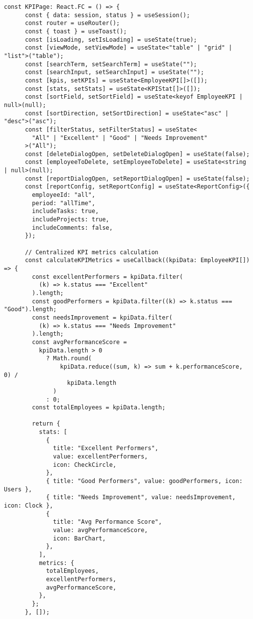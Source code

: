 \begin{lstlisting}[language=Golang, caption=Routes, frame=single]
    const KPIPage: React.FC = () => {
      const { data: session, status } = useSession();
      const router = useRouter();
      const { toast } = useToast();
      const [isLoading, setIsLoading] = useState(true);
      const [viewMode, setViewMode] = useState<"table" | "grid" | "list">("table");
      const [searchTerm, setSearchTerm] = useState("");
      const [searchInput, setSearchInput] = useState("");
      const [kpis, setKPIs] = useState<EmployeeKPI[]>([]);
      const [stats, setStats] = useState<KPIStat[]>([]);
      const [sortField, setSortField] = useState<keyof EmployeeKPI | null>(null);
      const [sortDirection, setSortDirection] = useState<"asc" | "desc">("asc");
      const [filterStatus, setFilterStatus] = useState<
        "All" | "Excellent" | "Good" | "Needs Improvement"
      >("All");
      const [deleteDialogOpen, setDeleteDialogOpen] = useState(false);
      const [employeeToDelete, setEmployeeToDelete] = useState<string | null>(null);
      const [reportDialogOpen, setReportDialogOpen] = useState(false);
      const [reportConfig, setReportConfig] = useState<ReportConfig>({
        employeeId: "all",
        period: "allTime",
        includeTasks: true,
        includeProjects: true,
        includeComments: false,
      });
    
      // Centralized KPI metrics calculation
      const calculateKPIMetrics = useCallback((kpiData: EmployeeKPI[]) => {
        const excellentPerformers = kpiData.filter(
          (k) => k.status === "Excellent"
        ).length;
        const goodPerformers = kpiData.filter((k) => k.status === "Good").length;
        const needsImprovement = kpiData.filter(
          (k) => k.status === "Needs Improvement"
        ).length;
        const avgPerformanceScore =
          kpiData.length > 0
            ? Math.round(
                kpiData.reduce((sum, k) => sum + k.performanceScore, 0) /
                  kpiData.length
              )
            : 0;
        const totalEmployees = kpiData.length;
    
        return {
          stats: [
            {
              title: "Excellent Performers",
              value: excellentPerformers,
              icon: CheckCircle,
            },
            { title: "Good Performers", value: goodPerformers, icon: Users },
            { title: "Needs Improvement", value: needsImprovement, icon: Clock },
            {
              title: "Avg Performance Score",
              value: avgPerformanceScore,
              icon: BarChart,
            },
          ],
          metrics: {
            totalEmployees,
            excellentPerformers,
            avgPerformanceScore,
          },
        };
      }, []);
    

\end{lstlisting}
